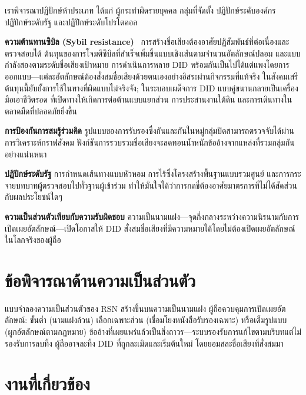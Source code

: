 \documentclass[11pt,a4paper,twocolumn]{article}
\begin{document}
เราพิจารณาปฏิปักษ์ห้าประเภท ได้แก่ ผู้กระทำผิดรายบุคคล กลุ่มที่จัดตั้ง ปฏิปักษ์ระดับองค์กร ปฏิปักษ์ระดับรัฐ และปฏิปักษ์ระดับโปรโตคอล

\textbf{ความต้านทานซิบิล (Sybil resistance)}~\cite{douceur2002} การสร้างชื่อเสียงต้องอาศัยปฏิสัมพันธ์ที่ต่อเนื่องและตรวจสอบได้ ต้นทุนของการโจมตีซิบิลที่สำเร็จเพิ่มขึ้นแบบเชิงเส้นตามจำนวนอัตลักษณ์ปลอม และแบบกำลังสองตามระดับชื่อเสียงเป้าหมาย การดำเนินการหลาย DID พร้อมกันเป็นไปได้แต่แพงโดยการออกแบบ---แต่ละอัตลักษณ์ต้องสั่งสมชื่อเสียงด้วยตนเองอย่างอิสระผ่านกิจกรรมที่แท้จริง ในสังคมเสรี ต้นทุนนี้ยับยั้งการใช้ในทางที่ผิดแบบไม่จริงจัง; ในระบอบเผด็จการ DID แบบคู่ขนานกลายเป็นเครื่องมือเอาชีวิตรอด ที่เปิดทางให้เกิดการต่อต้านแบบแยกส่วน การประสานงานใต้ดิน และการเดินทางในตลาดมืดที่ปลอดภัยยิ่งขึ้น

\textbf{การป้องกันการสมรู้ร่วมคิด} รูปแบบของการรับรองซึ่งกันและกันในหมู่กลุ่มปิดสามารถตรวจจับได้ผ่านการวิเคราะห์กราฟสังคม ฟังก์ชันการรวบรวมชื่อเสียงจะลดทอนน้ำหนักข้ออ้างจากแหล่งที่รวมกลุ่มกันอย่างแน่นหนา

\textbf{ปฏิปักษ์ระดับรัฐ} การกำหนดเส้นทางแบบหัวหอม การไร้ซึ่งโครงสร้างพื้นฐานแบบรวมศูนย์ และการกระจายบทบาทผู้ตรวจสอบไปทั่วฐานผู้เข้าร่วม ทำให้มั่นใจได้ว่าการกดขี่ต้องอาศัยมาตรการที่ไม่ได้สัดส่วนกับผลประโยชน์ใดๆ

\textbf{ความเป็นส่วนตัวเทียบกับความรับผิดชอบ} ความเป็นนามแฝง---จุดกึ่งกลางระหว่างความนิรนามกับการเปิดเผยอัตลักษณ์---เปิดโอกาสให้ DID สั่งสมชื่อเสียงที่มีความหมายได้โดยไม่ต้องเปิดเผยอัตลักษณ์ในโลกจริงของผู้ถือ

\section{ข้อพิจารณาด้านความเป็นส่วนตัว}

แบบจำลองความเป็นส่วนตัวของ RSN สร้างขึ้นบนความเป็นนามแฝง ผู้ถือควบคุมการเปิดเผยอัตลักษณ์: ขั้นต่ำ (นามแฝงล้วน) เลือกเฉพาะส่วน (เชื่อมโยงหนังสือรับรองเฉพาะ) หรือเต็มรูปแบบ (ผูกอัตลักษณ์ตามกฎหมาย) ข้ออ้างที่เผยแพร่แล้วเป็นสิ่งถาวร---ระบบรองรับการแก้ไขตามบริบทแต่ไม่รองรับการลบทิ้ง ผู้ถืออาจละทิ้ง DID ที่ถูกละเมิดและเริ่มต้นใหม่ โดยยอมสละชื่อเสียงที่สั่งสมมา

\section{งานที่เกี่ยวข้อง}
\end{document}
